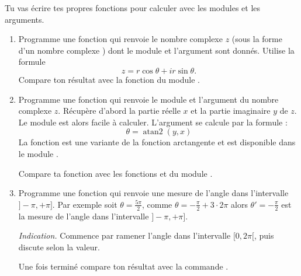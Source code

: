 \documentclass[11pt,class=report,crop=false]{standalone}
\begin{document}

\begin{activite}


Tu vas écrire tes propres fonctions pour calculer avec les modules et les arguments.

\begin{enumerate}
  \item Programme une fonction  qui renvoie le nombre complexe $z$ (sous la forme d'un nombre complexe \Python) dont le module et l'argument sont donnés.
  Utilise la formule 
  $$z = r\cos\theta + ir\sin\theta.$$
  Compare ton résultat avec la fonction  du module .
  
  
  \item Programme une fonction  qui renvoie le module et l'argument du nombre complexe $z$.
Récupère d'abord la partie réelle $x$ et la partie imaginaire $y$ de $z$. 
Le module est alors facile à calculer. L'argument se calcule par la formule :
$$\theta = \operatorname{atan2}(y,x)$$
La fonction  est une variante de la fonction \og{}arctangente\fg{} et est disponible dans le module .

  Compare ta fonction avec les fonctions  et  du module .
  
  \item Programme une fonction  qui renvoie une mesure de l'angle dans l'intervalle $]-\pi,+\pi]$. Par exemple soit $\theta = \frac{5\pi}{2}$,  
 comme $\theta = -\frac\pi2 + 3 \cdot 2\pi$ alors $\theta'= -\frac\pi2$ est la mesure de l'angle dans l'intervalle $]-\pi,+\pi]$.
 
 \emph{Indication.} Commence par ramener l'angle dans l'intervalle $[0,2\pi[$, puis discute selon la valeur.
 
 Une fois terminé compare ton résultat avec la commande .

\end{enumerate} 
\end{activite}
\end{document}
